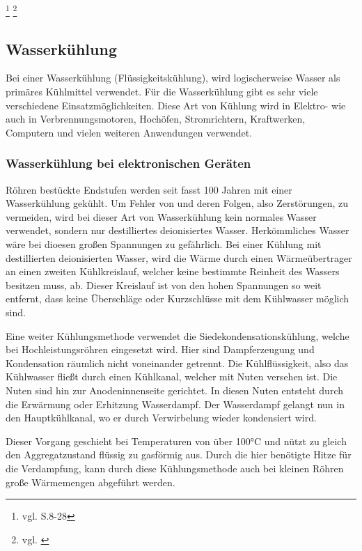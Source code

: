 \footnote{vgl. \cite{Kuehlung1} S.8-28}
\footnote{vgl. \cite{Kuehlung2}}

\newpage


\subsection{Wasserkühlung}  \label{Stand der Technik}

Bei einer Wasserkühlung (Flüssigkeitskühlung), wird logischerweise Wasser als primäres Kühlmittel verwendet. Für die Wasserkühlung gibt es sehr viele verschiedene Einsatzmöglichkeiten. Diese Art von Kühlung wird in Elektro- wie auch in Verbrennungsmotoren, Hochöfen, Stromrichtern, Kraftwerken, Computern und vielen weiteren Anwendungen verwendet.   

\subsubsection{Wasserkühlung bei elektronischen Geräten}

Röhren bestückte Endstufen werden seit fasst 100 Jahren mit einer Wasserkühlung gekühlt. Um Fehler von und deren Folgen, also Zerstörungen, zu vermeiden, wird bei dieser Art von Wasserkühlung kein normales Wasser verwendet, sondern nur destilliertes deionisiertes Wasser. Herkömmliches Wasser wäre bei dioesen großen Spannungen zu gefährlich. Bei einer Kühlung mit destillierten deionisierten Wasser, wird die Wärme durch einen Wärmeübertrager an einen zweiten Kühlkreislauf, welcher keine bestimmte Reinheit des Wassers besitzen muss, ab. Dieser Kreislauf ist von den hohen Spannungen so weit entfernt, dass keine Überschläge oder Kurzschlüsse mit dem Kühlwasser möglich sind. 

Eine weiter Kühlungsmethode verwendet die Siedekondensationskühlung, welche bei Hochleistungsröhren eingesetzt wird. Hier sind Dampferzeugung und Kondensation räumlich nicht voneinander getrennt. Die Kühlflüssigkeit, also das Kühlwasser fließt durch einen Kühlkanal, welcher mit Nuten versehen ist. Die Nuten sind hin zur Anodeninnenseite gerichtet.
In diesen Nuten entsteht durch die Erwärmung oder Erhitzung Wasserdampf. Der Wasserdampf gelangt nun in den Hauptkühlkanal, wo er durch Verwirbelung wieder kondensiert wird.

Dieser Vorgang geschieht bei Temperaturen von über 100°C und nützt zu gleich den Aggregatzustand flüssig zu gasförmig aus. Durch die hier benötigte Hitze für die Verdampfung, kann durch diese Kühlungsmethode auch bei kleinen Röhren große Wärmemengen abgeführt werden.

